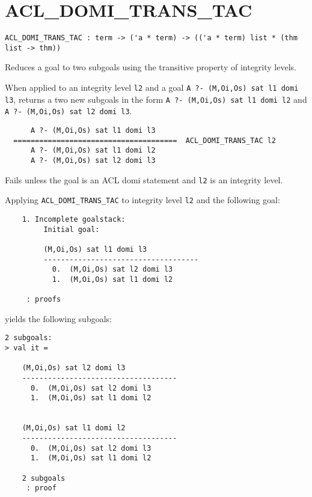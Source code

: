 \SEEALSO
\ENDDOC

\section{ACL\_DOMI\_TRANS\_TAC}



\small{
\begin{lstlisting}[breaklines]
ACL_DOMI_TRANS_TAC : term -> ('a * term) -> (('a * term) list * (thm list -> thm))
\end{lstlisting}}\egroup

\SYNOPSIS
Reduces a goal to two subgoals using the transitive property of integrity levels.

\DESCRIBE When applied to an integrity level \texttt{l2} and a goal \texttt{A ?- (M,Oi,Os) sat l1 domi l3}, returns a two new subgoals in the form \texttt{A ?- (M,Oi,Os) sat l1 domi l2} and \texttt{A ?- (M,Oi,Os) sat l2 domi l3}.
\begin{verbatim}
      A ?- (M,Oi,Os) sat l1 domi l3
  ======================================  ACL_DOMI_TRANS_TAC l2
      A ?- (M,Oi,Os) sat l1 domi l2     
      A ?- (M,Oi,Os) sat l2 domi l3
\end{verbatim}

\FAILURE 
Fails unless the goal is an ACL domi statement and \texttt{l2} is an integrity level.

\EXAMPLE
Applying \texttt{ACL\_DOMI\_TRANS\_TAC} to integrity level \texttt{l2} and the following goal:
\begin{holboxed}
\begin{verbatim}
    1. Incomplete goalstack:
         Initial goal:
    
         (M,Oi,Os) sat l1 domi l3
         ------------------------------------
           0.  (M,Oi,Os) sat l2 domi l3
           1.  (M,Oi,Os) sat l1 domi l2
    
     : proofs
\end{verbatim}
\end{holboxed}
yields the following subgoals:
\begin{holboxed}
\begin{verbatim}
2 subgoals:
> val it =
    
    (M,Oi,Os) sat l2 domi l3
    ------------------------------------
      0.  (M,Oi,Os) sat l2 domi l3
      1.  (M,Oi,Os) sat l1 domi l2
    
    
    (M,Oi,Os) sat l1 domi l2
    ------------------------------------
      0.  (M,Oi,Os) sat l2 domi l3
      1.  (M,Oi,Os) sat l1 domi l2
    
    2 subgoals
     : proof
\end{verbatim}
\end{holboxed}

